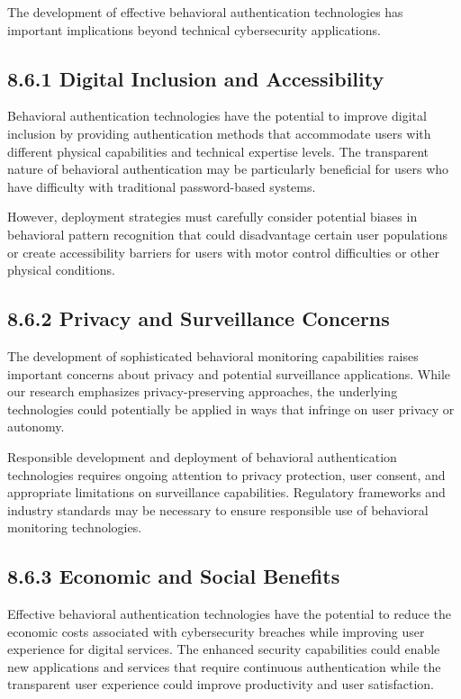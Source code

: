 \documentclass[
  12pt,
  a4paper,
]{report}
\begin{document}
The development of effective behavioral authentication technologies has
important implications beyond technical cybersecurity applications.

\subsection{8.6.1 Digital Inclusion and
Accessibility}\label{digital-inclusion-and-accessibility}

Behavioral authentication technologies have the potential to improve
digital inclusion by providing authentication methods that accommodate
users with different physical capabilities and technical expertise
levels. The transparent nature of behavioral authentication may be
particularly beneficial for users who have difficulty with traditional
password-based systems.

However, deployment strategies must carefully consider potential biases
in behavioral pattern recognition that could disadvantage certain user
populations or create accessibility barriers for users with motor
control difficulties or other physical conditions.

\subsection{8.6.2 Privacy and Surveillance
Concerns}\label{privacy-and-surveillance-concerns}

The development of sophisticated behavioral monitoring capabilities
raises important concerns about privacy and potential surveillance
applications. While our research emphasizes privacy-preserving
approaches, the underlying technologies could potentially be applied in
ways that infringe on user privacy or autonomy.

Responsible development and deployment of behavioral authentication
technologies requires ongoing attention to privacy protection, user
consent, and appropriate limitations on surveillance capabilities.
Regulatory frameworks and industry standards may be necessary to ensure
responsible use of behavioral monitoring technologies.

\subsection{8.6.3 Economic and Social
Benefits}\label{economic-and-social-benefits}

Effective behavioral authentication technologies have the potential to
reduce the economic costs associated with cybersecurity breaches while
improving user experience for digital services. The enhanced security
capabilities could enable new applications and services that require
continuous authentication while the transparent user experience could
improve productivity and user satisfaction.
\end{document}
